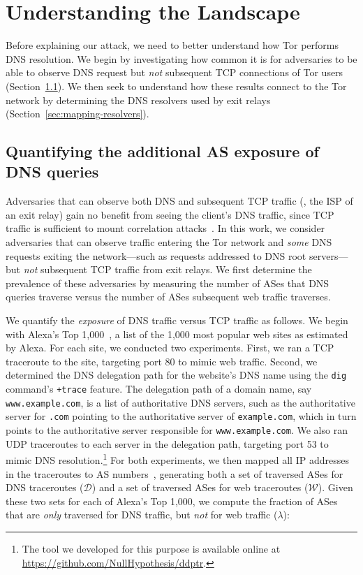 \section{Understanding the Landscape}
\label{sec:landscape}

Before explaining our attack, we need to better understand how Tor performs DNS
resolution.  We begin by investigating how common it is for adversaries
to be able to observe DNS request but \emph{not} subsequent TCP connections of
Tor users (Section~\ref{sec:as-exposure}).  We then seek to understand how
these results connect to the Tor network by determining the DNS resolvers used
by exit relays (Section~\ref{sec:mapping-resolvers}).

\subsection{Quantifying the additional AS exposure of DNS queries}
\label{sec:as-exposure}

Adversaries that can observe both DNS and subsequent TCP traffic (\eg, the ISP
of an exit relay) gain no benefit from seeing the client's DNS traffic,
since TCP traffic is sufficient to mount correlation
attacks~\cite{Murdoch2007a}.  In this work, we consider
adversaries that can observe traffic entering the Tor network and \emph{some}
DNS requests exiting the network---such as requests addressed to DNS
root servers---but {\em not} subsequent TCP traffic from exit relays.
We first determine the prevalence of these adversaries by measuring the
number of ASes that DNS queries traverse versus the
number of ASes subsequent web traffic traverses.

We quantify the {\em exposure} of DNS traffic versus TCP traffic as follows.  We
begin with Alexa's Top 1,000~\cite{alexatop1k}, a list of the 1,000 most popular
web sites as estimated by Alexa.  For each site, we conducted two
experiments.  First, we ran a TCP traceroute to the site, targeting port 80 to
mimic web traffic.  Second, we determined the DNS delegation path for the
website's DNS name using the {\tt dig} command's \texttt{+trace} feature.  The
delegation path of a domain name, say {\tt www.example.com}, is a list of
authoritative DNS servers, such as the authoritative server for {\tt .com}
pointing to the authoritative server of {\tt example.com}, which in turn points
to the authoritative server responsible for {\tt www.example.com}.  We also ran
UDP traceroutes to each server in the delegation path, targeting port 53 to
mimic DNS resolution.\footnote{The tool we developed for this purpose is
available online at \url{https://github.com/NullHypothesis/ddptr}.}
For both experiments, we then mapped all IP addresses in the traceroutes to AS
numbers~\cite{ipasn}, generating both a set of traversed ASes for DNS traceroutes
($\mathcal{D}$) and a set of traversed ASes for web traceroutes
($\mathcal{W}$).  Given these two sets for each of Alexa's Top
1,000, we compute the fraction of ASes that are \emph{only}
traversed for DNS traffic, but \emph{not} for web traffic ($\lambda$):

